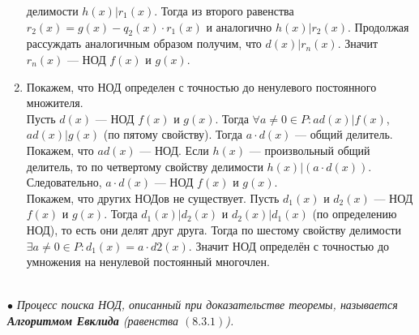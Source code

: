 \begin{Proof}
\begin{enumerate}
		делимости $h(x)|r_1(x)$. Тогда из второго равенства $r_2(x) = g(x) - q_2(x)\cdot r_1(x)$ и аналогично $h(x)|r_2(x)$. Продолжая 
		рассуждать аналогичным образом получим, что $d(x)|r_n(x)$. Значит $r_n(x)$ --- НОД $f(x)$ и $g(x)$.
		\item Покажем, что НОД определен с точностью до ненулевого постоянного множителя.\\
		Пусть $d(x)$ --- НОД $f(x)$ и $g(x)$. Тогда $\forall a \not= 0 \in P: ad(x) | f(x)$, $ad(x) | g(x)$ (по пятому свойству). Тогда $a\cdot d(x)$ --- общий делитель.\\
		Покажем, что $ad(x)$ --- НОД. Если $h(x)$ --- произвольный общий 
		делитель, то по четвертому свойству делимости  $h(x)|(a\cdot d(x))$. Следовательно, $a\cdot d(x)$ --- НОД $f(x)$ и $g(x)$.\\ 
		Покажем, что других НОДов не существует. Пусть $d_1(x)$ и $d_2(x)$ --- НОД $f(x)$ и $g(x)$. Тогда $d_1(x)|d_2(x)$ и 
		$d_2(x)|d_1(x)$ (по определению НОД), то есть они делят друг друга. Тогда по шестому свойству делимости 
		$\exists a \not= 0 \in P: d_1(x) = a\cdot d2(x)$. Значит НОД определён с точностью до умножения на ненулевой постоянный 
		многочлен.
	\end{enumerate}
\end{Proof}\\
$\bullet$ \textit{Процесс поиска НОД, описанный при доказательстве теоремы, называется
	\textbf{Алгоритмом Евклида} (равенства $(8.3.1)$).}



